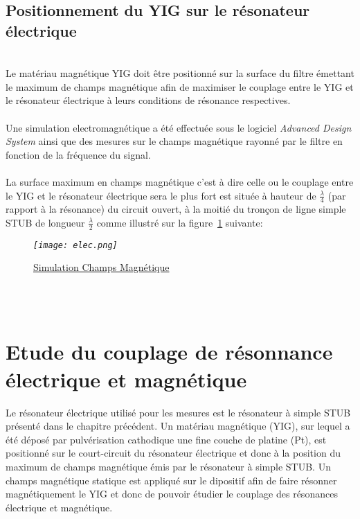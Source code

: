 \documentclass[12pt,fleqn]{book} %
\begin{document}
\section{Positionnement du YIG sur le résonateur électrique}
~\\
\noindent Le matériau magnétique YIG doit être positionné sur la surface du filtre émettant le maximum de champs magnétique afin de maximiser le couplage entre le YIG et le résonateur électrique à leurs conditions de résonance respectives.
~\\\\Une simulation electromagnétique a été effectuée sous le logiciel \emph{Advanced Design System} ainsi que des mesures sur le champs magnétique rayonné par le filtre en fonction de la fréquence du signal.
~\\\\La surface maximum en champs magnétique c'est à dire celle ou le couplage entre le YIG et le résonateur électrique sera le plus fort est située à hauteur de $\frac{\lambda}{4}$ (par rapport à la résonance) du circuit ouvert, à la moitié du tronçon de ligne simple STUB de longueur $\frac{\lambda}{2}$ comme illustré sur la figure~\underline{\color{blue}\ref{elec}} suivante:

\begin{figure}[H]
	\centering
	\itshape
	\texttt{[image: elec.png]}
	\caption{\label{elec} \underline{Simulation Champs Magnétique}}
\end{figure}
~\\\\
\chapter{Etude du couplage de résonnance électrique et magnétique }
Le résonateur électrique utilisé pour les mesures est le résonateur à simple STUB présenté dans le chapitre précédent. Un matériau magnétique (YIG), sur lequel a été déposé par pulvérisation cathodique une fine couche de platine (Pt), est positionné sur le court-circuit du résonateur électrique et donc à la position du maximum de champs magnétique émis par le résonateur à simple STUB. Un champs magnétique statique est appliqué sur le dipositif afin de faire résonner magnétiquement le YIG et donc de pouvoir étudier le couplage des résonances électrique et magnétique.
\end{document}
